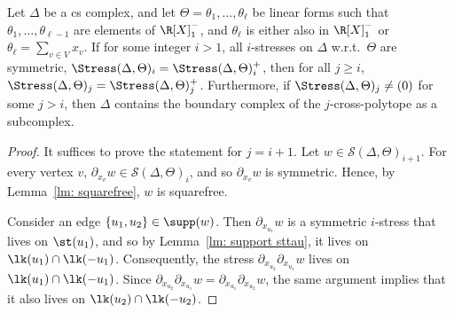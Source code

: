 \begin{theorem}\label{main theorem prep}
	Let $\Delta$ be a cs complex, and let $\Theta=\theta_1,\ldots,\theta_\ell$ be linear forms such that $\theta_1,\ldots,\theta_{\ell-1}$ are elements of $\R[X]^-_1$, and $\theta_\ell$ is either also in $\R[X]^-_1$ or $\theta_\ell=\sum_{v\in V} x_v$. If for some integer $i>1$, all $i$-stresses on $\Delta$ w.r.t.~$\Theta$ are symmetric, \ie $\Stress(\Delta,\Theta)_i=\Stress(\Delta,\Theta)^+_i$, then for all $j\geq i$, $\Stress(\Delta,\Theta)_{j}=\Stress(\Delta,\Theta)^+_{j}$. Furthermore, if $\Stress(\Delta,\Theta)_{j}\neq (0)$ for some $j> i$, then $\Delta$ contains the boundary complex of the $j$-cross-polytope as a subcomplex.
\end{theorem}
\begin{proof}
	It suffices to prove the statement for $j=i+1$. Let $w\in \mathcal{S}(\Delta, \Theta)_{i+1}$. For every vertex $v$, $\partial_{x_v} w\in \mathcal{S}(\Delta, \Theta)_i$, and so $\partial_{x_v} w$ is symmetric. Hence, by Lemma~\ref{lm: squarefree}, $w$ is squarefree. 
	
	Consider an edge $\{u_1, u_2\}\in \supp(w)$. Then $\partial_{x_{u_1}} w$ is a symmetric $i$-stress that lives on $\st( u_1)$, and so by Lemma~\ref{lm: support sttau}, it lives on $\lk (u_1)\cap \lk (-u_1)$. Consequently, the stress $\partial_{x_{u_2}}\partial_{x_{u_1}} w$ lives on $\lk(u_1)\cap \lk(-u_1)$. Since $\partial_{x_{u_2}}\partial_{x_{u_1}} w=\partial_{x_{u_1}}\partial_{x_{u_2}} w$, the same argument implies that it also lives on $\lk(u_2)\cap \lk(-u_2)$. 
	

\end{proof}
